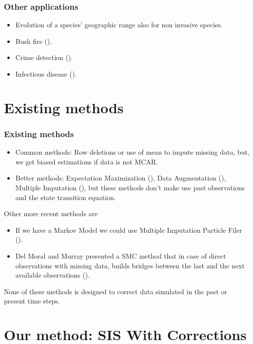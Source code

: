 \documentclass[9pt, xcolor={dvipsnames,svgnames,table}]{beamer}
\begin{document}
\begin{frame}
    \frametitle{Other applications}
    \begin{itemize}
    \setlength\itemsep{1em}
        \item Evolution of a species’ geographic range also for non invasive species.
        \item Bush fire (\cite{Beer}).
        \item Crime detection (\cite{Malathy}).
        \item Infectious disease (\cite{O'Neill}).
    \end{itemize}
\end{frame}





\section{Existing methods}

\begin{frame}
    \frametitle{Existing methods}
    \begin{itemize}
        \setlength\itemsep{2em}
        \item Common methods: Row deletions or use of mean to impute missing data, but, we get biased estimations if data is not MCAR.
        \item Better methods: Expectation Maximization (\cite{Dempster}), Data Augmentation (\cite{Tanner}), Multiple Imputation (\cite{Rubin}), but these methods don't make use past observations and the state transition equation.
    \end{itemize}
    Other more recent methods are
    \begin{itemize}
        \item If we have a Markov Model we could use Multiple Imputation Particle Filer (\cite{Zhang}).
        \item Del Moral and Murray presented a SMC method that in case of direct observations with missing data, builds bridges between the last and the next available observations  (\cite{DelMoral}).
    \end{itemize}
    None of these methods is designed to correct data simulated in the past or present time steps.
\end{frame}





\section{Our method: SIS With Corrections}
\end{document}

